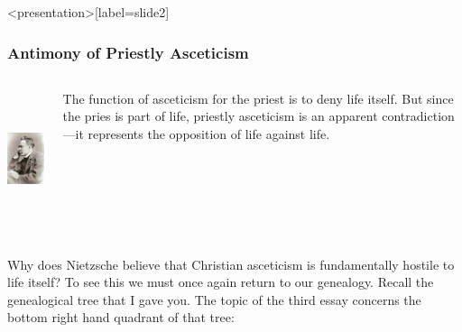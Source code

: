 \begin{frame}<presentation>[label=slide2]
    \frametitle{Antimony of Priestly Asceticism}
        \begin{columns}
            \begin{column}{3cm}
                \includegraphics[height=4cm]{../../graphics/nietzsche.jpg}
            \end{column}
            \begin{column}{7cm}
                The function of asceticism for the priest is to deny life itself. But since the pries is part of life, priestly asceticism is an apparent contradiction---it represents the opposition of life against life.
            \end{column}
        \end{columns}
\end{frame}

Why does Nietzsche believe that Christian asceticism is fundamentally hostile to life itself? To see this we must once again return to our genealogy. Recall the genealogical tree that I gave you. The topic of the third essay concerns the bottom right hand quadrant of that tree:

\begin{center}
\end{center}


